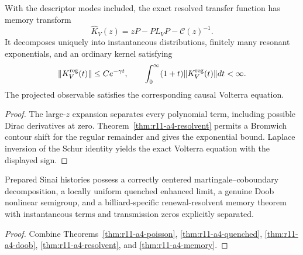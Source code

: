 \begin{theorem}
\label{thm:r11-a4-memory}
With the descriptor modes included, the exact resolved transfer function has
memory transform
\[
 \widehat K_V(z)=zP-PL_VP-\mathcal C(z)^{-1}.
\]
It decomposes uniquely into instantaneous distributions, finitely many
resonant exponentials, and an ordinary kernel satisfying
\[
 \|K_V^{\rm reg}(t)\|\le Ce^{-\gamma t},
 \qquad
 \int_0^\infty(1+t)\|K_V^{\rm reg}(t)\|dt<\infty.
\]
The projected observable satisfies the corresponding causal Volterra equation.
\end{theorem}

\begin{proof}
The large-$z$ expansion separates every polynomial term, including possible
Dirac derivatives at zero.  Theorem~\ref{thm:r11-a4-resolvent} permits a
Bromwich contour shift for the regular remainder and gives the exponential
bound.  Laplace inversion of the Schur identity yields the exact Volterra
equation with the displayed sign.
\end{proof}

\begin{theorem}
\label{thm:r11-a4-main}
Prepared Sinai histories possess a correctly centered martingale--coboundary
decomposition, a locally uniform quenched enhanced limit, a genuine Doob
nonlinear semigroup, and a billiard-specific renewal-resolvent memory theorem
with instantaneous terms and transmission zeros explicitly separated.
\end{theorem}

\begin{proof}
Combine Theorems~\ref{thm:r11-a4-poisson},
\ref{thm:r11-a4-quenched}, \ref{thm:r11-a4-doob},
\ref{thm:r11-a4-resolvent}, and \ref{thm:r11-a4-memory}.
\end{proof}
